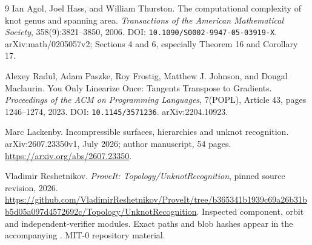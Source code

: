 \documentclass[11pt]{article}
\theoremstyle{definition}\newtheorem{definition}[theorem]{Definition}
\theoremstyle{remark}\newtheorem{remark}[theorem]{Remark}
\begin{document}
\begin{thebibliography}{9}
Ian Agol, Joel Hass, and William Thurston.
\newblock The computational complexity of knot genus and spanning area.
\newblock \emph{Transactions of the American Mathematical Society},
358(9):3821--3850, 2006.
\newblock DOI: \texttt{10.1090/S0002-9947-05-03919-X}.
\newblock arXiv:math/0205057v2; Sections 4 and 6, especially Theorem 16 and Corollary 17.

Alexey Radul, Adam Paszke, Roy Frostig, Matthew J. Johnson, and Dougal Maclaurin.
\newblock You Only Linearize Once: Tangents Transpose to Gradients.
\newblock \emph{Proceedings of the ACM on Programming Languages},
7(POPL), Article 43, pages 1246--1274, 2023.
\newblock DOI: \texttt{10.1145/3571236}. arXiv:2204.10923.

Marc Lackenby.
\newblock Incompressible surfaces, hierarchies and unknot recognition.
\newblock arXiv:2607.23350v1, July 2026; author manuscript, 54 pages.
\newblock \url{https://arxiv.org/abs/2607.23350}.

Vladimir Reshetnikov.
\newblock \emph{ProveIt: Topology/UnknotRecognition}, pinned source revision, 2026.
\newblock \url{https://github.com/VladimirReshetnikov/ProveIt/tree/b365341b1939c69a26b31bb5d05a097d4572692c/Topology/UnknotRecognition}.
\newblock Inspected component, orbit and independent-verifier modules. Exact
paths and blob hashes appear in the accompanying .
MIT-0 repository material.
\end{thebibliography}
\end{document}
